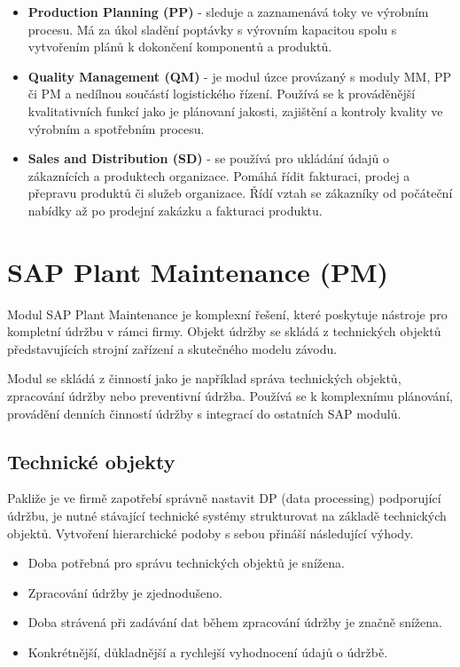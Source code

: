 \documentclass[thesis=M,czech]{FITthesis}[2012/06/26]
\begin{document}
\begin{itemize}
	\item
	\textbf{Production Planning (PP)} - sleduje a zaznamenává toky ve výrobním procesu. Má za úkol sladění poptávky s výrovním kapacitou spolu s vytvořením plánů k dokončení komponentů a produktů.
	\item
	\textbf{Quality Management (QM)} - je modul úzce provázaný s moduly MM, PP či PM a nedílnou součástí logistického řízení. Používá se k prováděnější kvalitativních funkcí jako je plánovaní jakosti, zajištění a kontroly kvality ve výrobním a spotřebním procesu.
	\item
	\textbf{Sales and Distribution (SD)} - se používá pro ukládání údajů o zákaznících a produktech organizace. Pomáhá řídit fakturaci, prodej a přepravu produktů či služeb organizace. Řídí vztah se zákazníky od počáteční nabídky až po prodejní zakázku a fakturaci produktu.   
\end{itemize} 	

\section{SAP Plant Maintenance (PM)}
Modul SAP Plant Maintenance je komplexní řešení, které poskytuje nástroje pro kompletní údržbu v rámci firmy. Objekt údržby se skládá z technických objektů představujících strojní zařízení a skutečného modelu závodu.

Modul se skládá z činností jako je například správa technických objektů, zpracování údržby nebo preventivní údržba. Používá se k komplexnímu plánování, provádění denních činností údržby s integrací do ostatních SAP modulů.

\subsection{Technické objekty}
Pakliže je ve firmě zapotřebí správně nastavit DP (data processing) podporující údržbu, je nutné stávající technické systémy strukturovat na základě technických objektů. Vytvoření hierarchické podoby s sebou přináší následující výhody.
\begin{itemize}
	\item
	Doba potřebná pro správu technických objektů je snížena.
	\item
	Zpracování údržby je zjednodušeno.
	\item
	Doba strávená při zadávání dat během zpracování údržby je značně snížena.
	\item
	Konkrétnější, důkladnější a rychlejší vyhodnocení údajů o údržbě.
\end{itemize}
\end{document}

